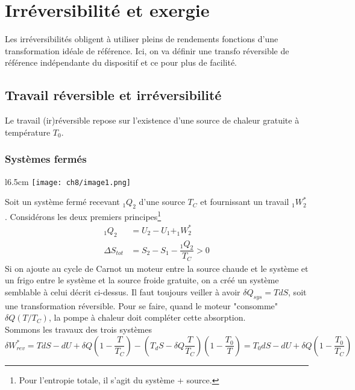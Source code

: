 \chapter{Irréversibilité et exergie}
Les irréversibilités obligent à utiliser pleins de rendements fonctions d'une 
transformation idéale de référence. Ici, on va définir une transfo réversible de 
référence indépendante du dispositif et ce pour plus de facilité.

	\section{Travail réversible et irréversibilité}
	Le travail (ir)réversible repose sur l'existence d'une source de chaleur 
	gratuite à température $T_0$.
	
		\subsection{Systèmes fermés}
			\begin{wrapfigure}[13]{l}{6.5cm}
	\texttt{[image: ch8/image1.png]}
	\end{wrapfigure}
		Soit un système fermé recevant $_1Q_2$ d'une source $T_C$ et fournissant 
		un travail $_1W_2^*$. Considérons les deux premiers principes\footnote{Pour 
		l'entropie totale, il s'agit du système + source.}
		\begin{equation}
		\begin{array}{ll}
		_1Q_2 &= U_2-U_1 + _1W_2^*\\
		\Delta S_{tot} &= S_2-S_1 - \dfrac{_1Q_2}{T_C}>0
		\end{array}
		\end{equation}
		Si on ajoute au cycle de Carnot un moteur entre la source chaude et le 
		système et un frigo entre le système et la source froide gratuite, on a 
		créé un système semblable à celui décrit ci-dessus. Il faut toujours veiller 
		à avoir $\delta Q_{sys} = TdS$, soit une transformation réversible. Pour se 
		faire, quand le moteur "consomme" $\delta Q(T/T_C)$, la pompe à chaleur doit 
		compléter cette absorption.\\
		Sommons les travaux des trois systèmes 
		\begin{equation}
		\delta W_{rev}^* = TdS - dU + \delta Q\left(1-\dfrac{T}{T_C}\right)-\left(
		T_dS - \delta Q \dfrac{T}{T_C}\right)\left(1-\dfrac{T_0}{T}\right) = T_0dS - dU + 
		\delta Q\left(1-\dfrac{T_0}{T_C}\right)
		\end{equation}
